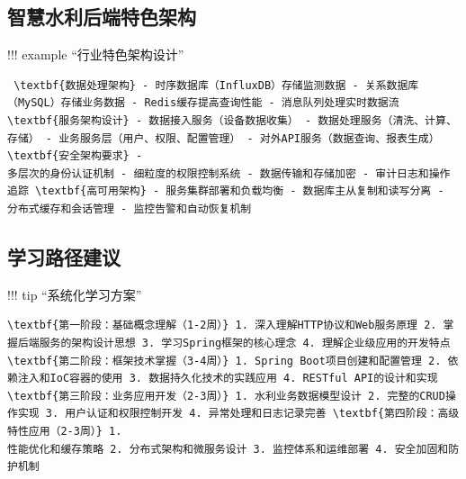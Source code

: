 \subsection{智慧水利后端特色架构}\label{ux667aux6167ux6c34ux5229ux540eux7aefux7279ux8272ux67b6ux6784} !!! example ``行业特色架构设计''
\begin{verbatim} \textbf{数据处理架构} - 时序数据库（InfluxDB）存储监测数据 - 关系数据库（MySQL）存储业务数据 - Redis缓存提高查询性能 - 消息队列处理实时数据流
\textbf{服务架构设计} - 数据接入服务（设备数据收集） - 数据处理服务（清洗、计算、存储） - 业务服务层（用户、权限、配置管理） - 对外API服务（数据查询、报表生成） \textbf{安全架构要求} -
多层次的身份认证机制 - 细粒度的权限控制系统 - 数据传输和存储加密 - 审计日志和操作追踪 \textbf{高可用架构} - 服务集群部署和负载均衡 - 数据库主从复制和读写分离 - 分布式缓存和会话管理 - 监控告警和自动恢复机制
\end{verbatim} \subsection{学习路径建议}\label{ux5b66ux4e60ux8defux5f84ux5efaux8bae} !!! tip ``系统化学习方案'' \begin{verbatim}
\textbf{第一阶段：基础概念理解（1-2周）} 1. 深入理解HTTP协议和Web服务原理 2. 掌握后端服务的架构设计思想 3. 学习Spring框架的核心理念 4. 理解企业级应用的开发特点
\textbf{第二阶段：框架技术掌握（3-4周）} 1. Spring Boot项目创建和配置管理 2. 依赖注入和IoC容器的使用 3. 数据持久化技术的实践应用 4. RESTful API的设计和实现
\textbf{第三阶段：业务应用开发（2-3周）} 1. 水利业务数据模型设计 2. 完整的CRUD操作实现 3. 用户认证和权限控制开发 4. 异常处理和日志记录完善 \textbf{第四阶段：高级特性应用（2-3周）} 1.
性能优化和缓存策略 2. 分布式架构和微服务设计 3. 监控体系和运维部署 4. 安全加固和防护机制 \end{verbatim}
